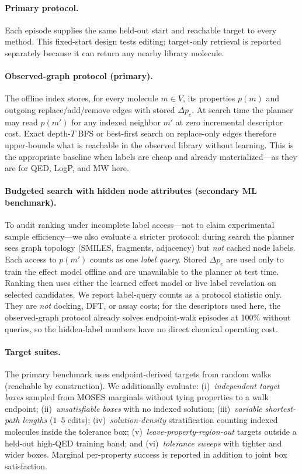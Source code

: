\documentclass[journal=jcisd8,manuscript=article,email=false]{achemso}
\begin{document}
\paragraph{Primary protocol.}
Each episode supplies the same held-out start and reachable target to every method. This fixed-start design tests editing; target-only retrieval is reported separately because it can return any nearby library molecule.

\paragraph{Observed-graph protocol (primary).}
The offline index stores, for every molecule $m\in V$, its properties $p(m)$ and outgoing replace/add/remove edges with stored $\Delta p_e$. At search time the planner may read $p(m')$ for any indexed neighbor $m'$ at zero incremental descriptor cost. Exact depth-$T$ BFS or best-first search on replace-only edges therefore upper-bounds what is reachable in the observed library without learning. This is the appropriate baseline when labels are cheap and already materialized---as they are for QED, LogP, and MW here.

\paragraph{Budgeted search with hidden node attributes (secondary ML benchmark).}
To audit ranking under incomplete label access---not to claim experimental sample efficiency---we also evaluate a stricter protocol: during search the planner sees graph topology (SMILES, fragments, adjacency) but \emph{not} cached node labels. Each access to $p(m')$ counts as one \emph{label query}. Stored $\Delta p_e$ are used only to train the effect model offline and are unavailable to the planner at test time. Ranking then uses either the learned effect model or live label revelation on selected candidates. We report label-query counts as a protocol statistic only. They are \emph{not} docking, DFT, or assay costs; for the descriptors used here, the observed-graph protocol already solves endpoint-walk episodes at 100\% without queries, so the hidden-label numbers have no direct chemical operating cost.

\paragraph{Target suites.}
The primary benchmark uses endpoint-derived targets from random walks (reachable by construction). We additionally evaluate: (i)~\emph{independent target boxes} sampled from MOSES marginals without tying properties to a walk endpoint; (ii)~\emph{unsatisfiable boxes} with no indexed solution; (iii)~\emph{variable shortest-path lengths} ($1$--$5$ edits); (iv)~\emph{solution-density} stratification counting indexed molecules inside the tolerance box; (v)~\emph{leave-property-region-out} targets outside a held-out high-QED training band; and (vi)~\emph{tolerance sweeps} with tighter and wider boxes. Marginal per-property success is reported in addition to joint box satisfaction.
\end{document}
